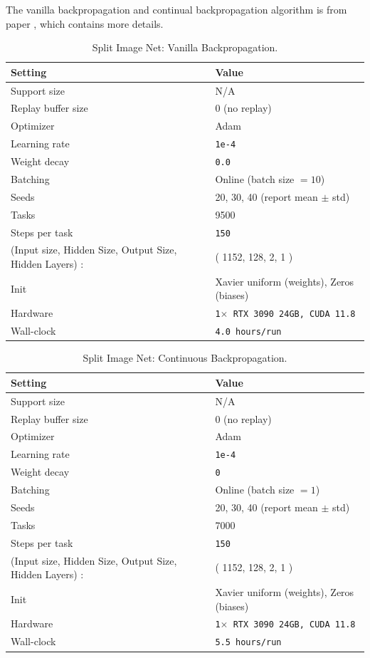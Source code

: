 \documentclass{article}
\begin{document}
The vanilla backpropagation and continual backpropagation algorithm is from paper \citep{dohare2024loss}, which contains more details.

\begin{table}[H]
\centering
\footnotesize
\caption{Split Image Net: Vanilla Backpropagation.}
\label{tab:split_image_net_bp}
\begin{tabular}{@{}ll@{}}
\toprule
Setting & Value \\ \midrule
Support size & N/A \\
Replay buffer size & 0 (no replay) \\
Optimizer & Adam \\
Learning rate & \texttt{1e-4} \\
Weight decay & \texttt{0.0} \\
Batching & Online (batch size $=10$) \\
Seeds & 20, 30, 40 (report mean $\pm$ std) \\
Tasks & 9500 \\
Steps per task & \texttt{150} \\
(Input size, Hidden Size, Output Size, Hidden Layers) : & ( 1152, 128, 2, 1 ) \\ 
Init &  Xavier uniform (weights), Zeros (biases) \\
Hardware & \texttt{1$\times$ RTX 3090 24GB, CUDA 11.8} \\
Wall-clock & \texttt{4.0 hours/run} \\
\bottomrule
\end{tabular}
\end{table}

\begin{table}[H]
\centering
\footnotesize
\caption{Split Image Net: Continuous Backpropagation.}
\label{tab:split_image_net_cbp}
\begin{tabular}{@{}ll@{}}
\toprule
Setting & Value \\ \midrule
Support size & N/A \\
Replay buffer size & 0 (no replay) \\
Optimizer & Adam  \\
Learning rate & \texttt{1e-4} \\
Weight decay & \texttt{0} \\
Batching & Online (batch size $=1$) \\
Seeds & 20, 30, 40 (report mean $\pm$ std) \\
Tasks & 7000 \\
Steps per task & \texttt{150} \\
(Input size, Hidden Size, Output Size, Hidden Layers) : & ( 1152, 128, 2, 1 ) \\ 
Init &  Xavier uniform (weights), Zeros (biases)\\
Hardware & \texttt{1$\times$ RTX 3090 24GB, CUDA 11.8} \\
Wall-clock & \texttt{5.5 hours/run} \\
\bottomrule
\end{tabular}
\end{table}
\end{document}
